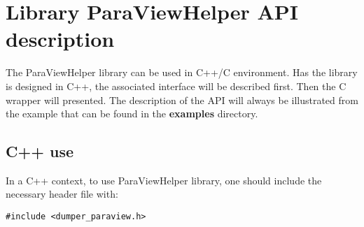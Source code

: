 %
%
%
%

\chapter{\label{libuse}Library ParaViewHelper API description}

The ParaViewHelper library can be used in C++/C environment. Has the library is designed in C++,
the associated interface will be described first. Then the C wrapper will presented.
The description of the API will always be illustrated from the example that can be found in the {\bf examples} 
directory.

\section{C++ use}
\lstset{language=C}
\lstset{xleftmargin=.1cm}
\lstset{xrightmargin=.1cm}

\noindent In a C++ context, to use ParaViewHelper library, one should include the necessary header file with:
\begin{lstlisting}[frame=tb,backgroundcolor=\color{white}]
#include <dumper_paraview.h>
\end{lstlisting}

